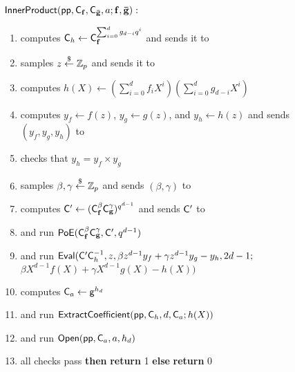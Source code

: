 \begin{figure}[!htp]
\noindent\begin{mdframed}[userdefinedwidth=\textwidth]
\begin{minipage}{\textwidth}
	\begin{flushleft}
	$\textsf{{InnerProduct}}(\textsf{pp}, \mathsf{C}_\mathbf{f}, \mathsf{C}_\mathbf{\bar{g}}, a; \mathbf{f}, \mathbf{\bar{g}}):$ 
		\begin{enumerate}[nolistsep]
		    \item \prover computes $\mathsf{C}_h \gets \mathsf{C}_\mathbf{f}^{\sum_{i=0}^{d} g_{d-i} q^i}$ and sends it to \verifier
		    \item \verifier samples $z \overset{\$}{\gets} \mathbb{Z}_p$ and sends it to \prover
		    \item \prover computes $h(X) \gets \left(\sum_{i=0}^d f_i X^i\right) \left(\sum_{i=0}^d g_{d-i} X^i\right)$
		    \item \prover computes $y_f \gets f(z)$, $y_g \gets g(z)$, and $y_h \gets h(z)$ and sends $(y_f, y_g, y_h)$ to \verifier
		    \item \verifier checks that $y_h = y_f \times y_g$
		    \item \verifier samples $\beta, \gamma \overset{\$}{\gets} \mathbb{Z}_p$ and sends $(\beta, \gamma)$ to \prover
		    \item \prover computes $\mathsf{C}' \gets (\mathsf{C}_\mathbf{f}^\beta \mathsf{C}_\mathbf{g}^\gamma)^{q^{d-1}}$ and sends $\mathsf{C}'$ to \verifier
		    \item \prover and \verifier run $\textsf{{PoE}}(\mathsf{C}_\mathbf{f}^\beta \mathsf{C}_\mathbf{g}^\gamma, \mathsf{C}', q^{d-1})$
		    \item \prover and \verifier run $\textsf{{Eval}}(\mathsf{C}'\mathsf{C}_h^{-1}, z, {\beta{} z^{d-1} y_f + \gamma{} z^{d-1} y_g - y_h} , {2d-1} ;$ ${\beta{} X^{d-1} f(X) + \gamma{} X^{d-1} g(X) - h(X)})$
		    \item \prover computes $\mathsf{C}_a \leftarrow \mathsf{g}^{h_d}$
		    \item \prover and \verifier run $\textsf{{ExtractCoefficient}}(\textsf{pp}, \mathsf{C}_h, d, \mathsf{C}_a; h(X))$
		    \item \prover and \verifier run $\textsf{{Open}}(\textsf{pp}, \mathsf{C}_a, a, h_d)$
		    \item \pcif{}all checks pass \textbf{then} \textbf{return} 1 \textbf{else} \textbf{return} 0
		\end{enumerate}
	\end{flushleft}
\end{minipage}
\end{mdframed}
\end{figure}


